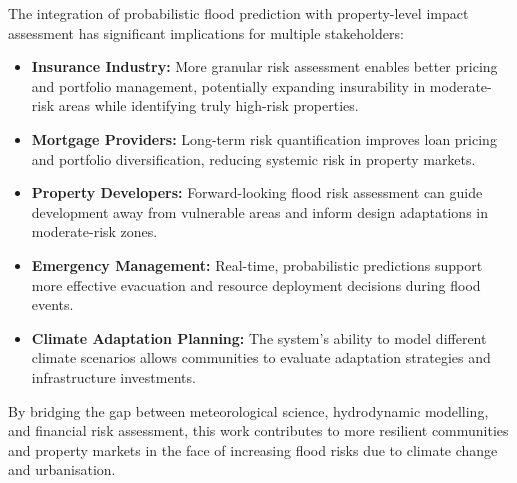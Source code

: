 \documentclass{article}
\begin{document}
The integration of probabilistic flood prediction with property-level impact assessment has significant implications for multiple stakeholders:

\begin{itemize}
    \item \textbf{Insurance Industry:} More granular risk assessment enables better pricing and portfolio management, potentially expanding insurability in moderate-risk areas while identifying truly high-risk properties.
    
    \item \textbf{Mortgage Providers:} Long-term risk quantification improves loan pricing and portfolio diversification, reducing systemic risk in property markets.
    
    \item \textbf{Property Developers:} Forward-looking flood risk assessment can guide development away from vulnerable areas and inform design adaptations in moderate-risk zones.
    
    \item \textbf{Emergency Management:} Real-time, probabilistic predictions support more effective evacuation and resource deployment decisions during flood events.
    
    \item \textbf{Climate Adaptation Planning:} The system's ability to model different climate scenarios allows communities to evaluate adaptation strategies and infrastructure investments.
\end{itemize}

By bridging the gap between meteorological science, hydrodynamic modelling, and financial risk assessment, this work contributes to more resilient communities and property markets in the face of increasing flood risks due to climate change and urbanisation.
\end{document}
